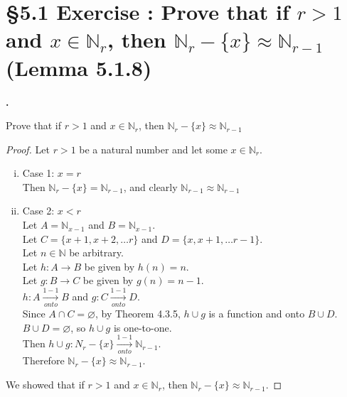 \documentclass[a4paper,11pt]{article}
\begin{document}
\section*{\S 5.1 Exercise : Prove that if \(r > 1\) and \(x \in \mathbb{N}_{r}\), then \(\mathbb{N}_{r}-\{x\} \approx \mathbb{N}_{r-1}\) (Lemma 5.1.8)}
\setcounter{SubsectionCounter}{3}
\textbf{.}
\begin{theorem1}
Prove that if \(r > 1\) and \(x \in \mathbb{N}_{r}\), then \(\mathbb{N}_{r}-\{x\} \approx \mathbb{N}_{r-1}\)
  \begin{proof}
  Let \(r > 1\) be a natural number and let some \(x \in \mathbb{N}_r\).
  \begin{enumerate}[(i)]
    \item Case 1: \(x = r\)\\
    Then \(\mathbb{N}_r - \{x\} = \mathbb{N}_{r-1}\), and clearly \(\mathbb{N}_{r-1} \approx \mathbb{N}_{r-1}\)
    \item Case 2: \(x < r\)\\
    Let \(A = \mathbb{N}_{x-1}\) and \(B = \mathbb{N}_{x-1}\).\\
    Let \(C = \{x+1,x+2,\ldots r\}\) and \(D = \{x, x+1, \ldots r-1\}\).\\
    Let \(n \in \mathbb{N}\) be arbitrary.\\
    Let \(h: A \rightarrow B\) be given by 
    \(h{(n)}=n\).\\
    Let \(g: B \rightarrow C\) be given by 
    \(g{(n)}=n-1\).\\
    \(h: A \xrightarrow[onto]{1-1} B\) and \(g: C \xrightarrow[onto]{1-1} D\).\\ 
    Since \(A \cap C = \varnothing\), by Theorem 4.3.5, \(h \cup g\) is a function and onto \(B \cup D\).\\
    \(B \cup D = \varnothing\), so \(h \cup g\) is one-to-one.\\
    Then \(h \cup g: N_{r} - \{x\} \xrightarrow[onto]{1-1} \mathbb{N}_{r-1}\).\\
    Therefore \(\mathbb{N}_{r} - \{x\} \approx \mathbb{N}_{r-1}\).
  \end{enumerate}
  We showed that if \(r > 1\) and \(x \in \mathbb{N}_r\), then \(\mathbb{N}_{r} - \{x\} \approx 
  \mathbb{N}_{r-1}\).
  \end{proof}
\end{theorem1}
\end{document}
